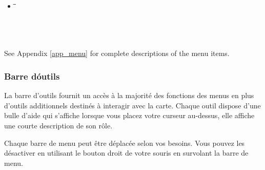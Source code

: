 \begin{itemize}
\item {}
\begin{tabbing}
\hspace{4.5cm}\=\hspace{3cm}\=\hspace{3.5cm}\= \kill
{}
 \> 
 \>            
 \> \\
 \> 
 \>           
 \\
 \\
 \\
\end{tabbing}

\end{itemize}

See Appendix \ref{app_menu} for complete descriptions of the menu items.

\subsubsection{Barre d\'outils}\label{label_toolbars}

%

La barre d'outils fournit un acc\`es \`a la majorit\'e des fonctions des menus en plus d'outils additionnels destin\'es \`a interagir avec la carte. Chaque outil dispose d'une bulle d'aide qui s'affiche lorsque vous placez votre curseur au-dessus, elle affiche une courte description de son r\^ole.

Chaque barre de menu peut \^etre d\'eplac\'ee selon vos besoins. Vous pouvez les d\'esactiver en utilisant le bouton droit de votre souris en survolant la barre de menu.

%

